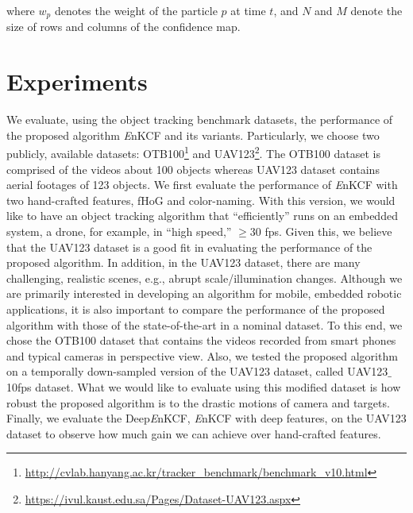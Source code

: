 \documentclass[10pt,twocolumn,letterpaper]{article}
\begin{document}
where $w_{p}$ denotes the weight of the particle $p$ at time $t$, and $N$ and $M$ denote the
size of rows and columns of the confidence map. 

\section{Experiments} \label{sc:Experiments}
We evaluate, using the object tracking benchmark datasets, the
performance of the proposed algorithm {\it E}nKCF and its variants.
Particularly, we choose two publicly, available datasets:
OTB100\footnote{\url{http://cvlab.hanyang.ac.kr/tracker_benchmark/benchmark_v10.html}}
and
UAV123\footnote{\url{https://ivul.kaust.edu.sa/Pages/Dataset-UAV123.aspx}}\cite{mueller2016uav123}.
The OTB100 dataset is comprised of the videos about 100 objects
whereas UAV123 dataset contains aerial footages of 123 objects.  We
first evaluate the performance of {\it E}nKCF with two hand-crafted
features, fHoG and color-naming.  With this version, we would like to
have an object tracking algorithm that ``efficiently'' runs on an
embedded system, a drone, for example, in ``high speed,'' $\ge 30$
fps. Given this, we believe that the UAV123 dataset is a good fit in
evaluating the performance of the proposed algorithm. In addition, in
the UAV123 dataset, there are many challenging, realistic scenes,
e.g., abrupt scale/illumination changes. Although we are primarily
interested in developing an algorithm for mobile, embedded robotic
applications, it is also important to compare the performance of the
proposed algorithm with those of the state-of-the-art in a nominal
dataset. To this end, we chose the OTB100 dataset that contains the
videos recorded from smart phones and typical cameras in perspective
view. Also, we tested the proposed algorithm on a temporally
down-sampled version of the UAV123 dataset, called UAV123$\_$10fps
dataset. What we would like to evaluate using this modified dataset is
how robust the proposed algorithm is to the drastic motions of camera
and targets. Finally, we evaluate the Deep{\it E}nKCF, {\it E}nKCF
with deep features, on the UAV123 dataset to observe how much gain we
can achieve over hand-crafted features.
\end{document}
